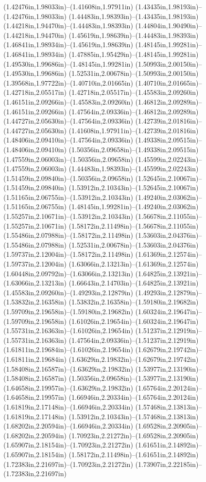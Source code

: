 (1.42476in,1.98033in)--(1.41608in,1.97911in) (1.43435in,1.98193in)--(1.42476in,1.98033in) (1.44483in,1.98393in)--(1.43435in,1.98193in) (1.44218in,1.94470in)--(1.44483in,1.98393in) (1.44804in,1.90490in)--(1.44218in,1.94470in) (1.45619in,1.98639in)--(1.44483in,1.98393in) (1.46841in,1.98934in)--(1.45619in,1.98639in) (1.48145in,1.99281in)--(1.46841in,1.98934in) (1.47885in,1.95429in)--(1.48145in,1.99281in) (1.49530in,1.99686in)--(1.48145in,1.99281in) (1.50993in,2.00150in)--(1.49530in,1.99686in) (1.52531in,2.00678in)--(1.50993in,2.00150in) (1.39568in,1.97722in)--(1.40710in,2.01665in) (1.40710in,2.01665in)--(1.42718in,2.05517in) (1.42718in,2.05517in)--(1.45583in,2.09260in) (1.46151in,2.09266in)--(1.45583in,2.09260in) (1.46812in,2.09289in)--(1.46151in,2.09266in) (1.47564in,2.09336in)--(1.46812in,2.09289in) (1.44727in,2.05630in)--(1.47564in,2.09336in) (1.42739in,2.01816in)--(1.44727in,2.05630in) (1.41608in,1.97911in)--(1.42739in,2.01816in) (1.48406in,2.09410in)--(1.47564in,2.09336in) (1.49338in,2.09515in)--(1.48406in,2.09410in) (1.50356in,2.09658in)--(1.49338in,2.09515in) (1.47559in,2.06003in)--(1.50356in,2.09658in) (1.45599in,2.02243in)--(1.47559in,2.06003in) (1.44483in,1.98393in)--(1.45599in,2.02243in) (1.51459in,2.09840in)--(1.50356in,2.09658in) (1.52645in,2.10067in)--(1.51459in,2.09840in) (1.53912in,2.10343in)--(1.52645in,2.10067in) (1.51165in,2.06755in)--(1.53912in,2.10343in) (1.49240in,2.03062in)--(1.51165in,2.06755in) (1.48145in,1.99281in)--(1.49240in,2.03062in) (1.55257in,2.10671in)--(1.53912in,2.10343in) (1.56678in,2.11055in)--(1.55257in,2.10671in) (1.58172in,2.11498in)--(1.56678in,2.11055in) (1.55486in,2.07988in)--(1.58172in,2.11498in) (1.53603in,2.04376in)--(1.55486in,2.07988in) (1.52531in,2.00678in)--(1.53603in,2.04376in) (1.59737in,2.12004in)--(1.58172in,2.11498in) (1.61369in,2.12574in)--(1.59737in,2.12004in) (1.63066in,2.13213in)--(1.61369in,2.12574in) (1.60448in,2.09792in)--(1.63066in,2.13213in) (1.64825in,2.13921in)--(1.63066in,2.13213in) (1.66643in,2.14703in)--(1.64825in,2.13921in) (1.45583in,2.09260in)--(1.49293in,2.12879in) (1.49293in,2.12879in)--(1.53832in,2.16358in) (1.53832in,2.16358in)--(1.59180in,2.19682in) (1.59709in,2.19658in)--(1.59180in,2.19682in) (1.60324in,2.19647in)--(1.59709in,2.19658in) (1.61026in,2.19654in)--(1.60324in,2.19647in) (1.55731in,2.16363in)--(1.61026in,2.19654in) (1.51237in,2.12919in)--(1.55731in,2.16363in) (1.47564in,2.09336in)--(1.51237in,2.12919in) (1.61811in,2.19684in)--(1.61026in,2.19654in) (1.62679in,2.19742in)--(1.61811in,2.19684in) (1.63629in,2.19832in)--(1.62679in,2.19742in) (1.58408in,2.16587in)--(1.63629in,2.19832in) (1.53977in,2.13190in)--(1.58408in,2.16587in) (1.50356in,2.09658in)--(1.53977in,2.13190in) (1.64658in,2.19957in)--(1.63629in,2.19832in) (1.65764in,2.20124in)--(1.64658in,2.19957in) (1.66946in,2.20334in)--(1.65764in,2.20124in) (1.61819in,2.17148in)--(1.66946in,2.20334in) (1.57468in,2.13813in)--(1.61819in,2.17148in) (1.53912in,2.10343in)--(1.57468in,2.13813in) (1.68202in,2.20594in)--(1.66946in,2.20334in) (1.69528in,2.20905in)--(1.68202in,2.20594in) (1.70923in,2.21272in)--(1.69528in,2.20905in) (1.65907in,2.18154in)--(1.70923in,2.21272in) (1.61651in,2.14892in)--(1.65907in,2.18154in) (1.58172in,2.11498in)--(1.61651in,2.14892in) (1.72383in,2.21697in)--(1.70923in,2.21272in) (1.73907in,2.22185in)--(1.72383in,2.21697in) 